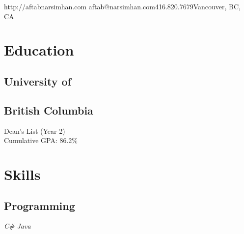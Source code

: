 \documentclass[]{aftab-resume}
\begin{document}
\lastupdated

       {http://aftabnarsimhan.com}
       {aftab@narsimhan.com}{416.820.7679}{Vancouver, BC, CA}
       

%
%

\begin{minipage}[t]{0.33\textwidth} 


\section{Education} 
\vspace{0.15cm}

\subsection{University of}
\subsection{British Columbia}
\vspace{0.05cm}
\vspace{0.05cm}
\vspace{0.05cm}
\textbullet{} Dean's List (Year 2) \\
\textbullet{} Cumulative GPA: 86.2\%
\vspace{0.075cm}

\sectionsep


\section{Skills}
\vspace{0.15cm}

\subsection{Programming}
\vspace{0.01cm}

\it{\textbullet{} C\# \textbullet{} Java \\ }
\vspace{0.05cm}


\end{minipage}
\end{document}

